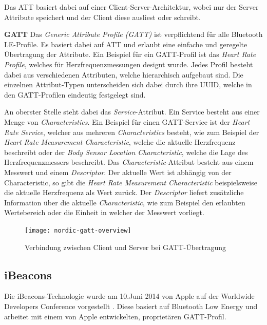Das ATT basiert dabei auf einer Client-Server-Architektur, wobei nur der Server Attribute speichert und der Client diese ausliest oder schreibt.

\textbf{GATT}
Das \emph{Generic Attribute Profile (GATT)} ist verpflichtend für alle Bluetooth LE-Profile. Es basiert dabei auf ATT und erlaubt eine einfache und geregelte Übertragung der Attribute. Ein Beispiel für ein GATT-Profil ist das \emph{Heart Rate Profile}, welches für Herzfrequenzmessungen designt wurde.
Jedes Profil besteht dabei aus verschiedenen Attributen, welche hierarchisch aufgebaut sind.
Die einzelnen Attribut-Typen unterscheiden sich dabei durch ihre UUID, welche in den GATT-Profilen eindeutig festgelegt sind.

An oberster Stelle steht dabei das \emph{Service}-Attribut. Ein Service besteht aus einer Menge von \emph{Characteristics}. Ein Beispiel für einen GATT-Service ist der \emph{Heart Rate Service}, welcher aus mehreren \emph{Characteristics} besteht, wie zum Beispiel der \emph{Heart Rate Measurement Characteristic}, welche die aktuelle Herzfrequenz beschreibt oder der \emph{Body Sensor Location Characteristic}, welche die Lage des Herzfrequenzmessers beschreibt. 
Das \emph{Characteristic}-Attribut besteht aus einem Messwert und einem \emph{Descriptor}. Der aktuelle Wert ist abhängig von der Characteristic, so gibt die \emph{Heart Rate Measurement Characteristic} beispielsweise die aktuelle Herzfrequenz als Wert zurück. 
Der \emph{Descriptor} liefert zusätzliche Information über die aktuelle \emph{Characteristic}, wie zum Beispiel den erlaubten Wertebereich oder die Einheit in welcher der Messwert vorliegt.

\begin{figure}[htb!]
		\centering
	\texttt{[image: nordic-gatt-overview]}
	\caption{Verbindung zwischen Client und Server bei GATT-Übertragung}
	\label{nordic-gatt-overview}
	\end{figure}


\subsection{iBeacons}
\label{sec:technologies:bluetoothLE:ibeacons}
Die iBeacons-Technologie wurde am 10.Juni 2014 von Apple auf der Worldwide Developers Conference vorgestellt \cite{appleinsideribeacons}. 
Diese basiert auf Bluetooth Low Energy und arbeitet mit einem von Apple entwickelten, proprietären GATT-Profil.

